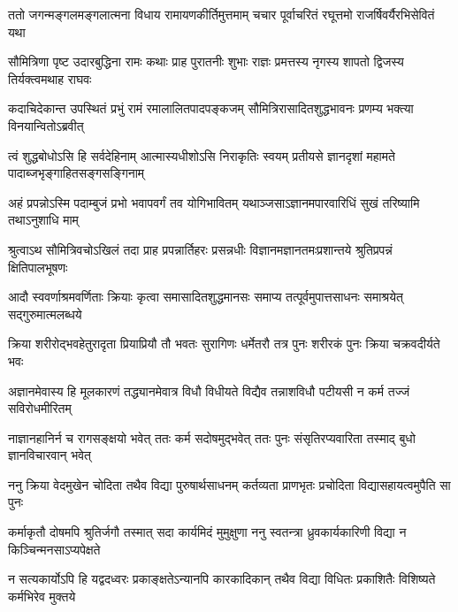 


\fourlineindentedshloka
{ततो जगन्मङ्गलमङ्गलात्मना}
{विधाय रामायणकीर्तिमुत्तमाम्}
{चचार पूर्वाचरितं रघूत्तमो}
{राजर्षिवर्यैरभिसेवितं यथा} %

\fourlineindentedshloka
{सौमित्रिणा पृष्ट उदारबुद्धिना}
{रामः कथाः प्राह पुरातनीः शुभाः}
{राज्ञः प्रमत्तस्य नृगस्य शापतो}
{द्विजस्य तिर्यक्त्वमथाह राघवः} %

\fourlineindentedshloka
{कदाचिदेकान्त उपस्थितं प्रभुं}
{रामं रमालालितपादपङ्कजम्}
{सौमित्रिरासादितशुद्धभावनः}
{प्रणम्य भक्त्या विनयान्वितोऽब्रवीत्} %

\fourlineindentedshloka
{त्वं शुद्धबोधोऽसि हि सर्वदेहिनाम्}
{आत्मास्यधीशोऽसि निराकृतिः स्वयम्}
{प्रतीयसे ज्ञानदृशां महामते}
{पादाब्जभृङ्गाहितसङ्गसङ्गिनाम्} %

\fourlineindentedshloka
{अहं प्रपन्नोऽस्मि पदाम्बुजं प्रभो}
{भवापवर्गं तव योगिभावितम्}
{यथाञ्जसाऽज्ञानमपारवारिधिं}
{सुखं तरिष्यामि तथाऽनुशाधि माम्} %

\fourlineindentedshloka
{श्रुत्वाऽथ सौमित्रिवचोऽखिलं तदा}
{प्राह प्रपन्नार्तिहरः प्रसन्नधीः}
{विज्ञानमज्ञानतमःप्रशान्तये}
{श्रुतिप्रपन्नं क्षितिपालभूषणः} %

\fourlineindentedshloka
{आदौ स्ववर्णाश्रमवर्णिताः क्रियाः}
{कृत्वा समासादितशुद्धमानसः}
{समाप्य तत्पूर्वमुपात्तसाधनः}
{समाश्रयेत् सद्गुरुमात्मलब्धये} %

\fourlineindentedshloka
{क्रिया शरीरोद्भवहेतुरादृता}
{प्रियाप्रियौ तौ भवतः सुरागिणः}
{धर्मेतरौ तत्र पुनः शरीरकं}
{पुनः क्रिया चक्रवदीर्यते भवः} %

\fourlineindentedshloka
{अज्ञानमेवास्य हि मूलकारणं}
{तद्ध्यानमेवात्र विधौ विधीयते}
{विद्यैव तन्नाशविधौ पटीयसी}
{न कर्म तज्जं सविरोधमीरितम्} %

\fourlineindentedshloka
{नाज्ञानहानिर्न च रागसङ्क्षयो}
{भवेत् ततः कर्म सदोषमुद्भवेत्}
{ततः पुनः संसृतिरप्यवारिता}
{तस्माद् बुधो ज्ञानविचारवान् भवेत्} %

\fourlineindentedshloka
{ननु क्रिया वेदमुखेन चोदिता}
{तथैव विद्या पुरुषार्थसाधनम्}
{कर्तव्यता प्राणभृतः प्रचोदिता}
{विद्यासहायत्वमुपैति सा पुनः} %

\fourlineindentedshloka
{कर्माकृतौ दोषमपि श्रुतिर्जगौ}
{तस्मात् सदा कार्यमिदं मुमुक्षुणा}
{ननु स्वतन्त्रा ध्रुवकार्यकारिणी}
{विद्या न किञ्चिन्मनसाऽप्यपेक्षते} %

\fourlineindentedshloka
{न सत्यकार्योऽपि हि यद्वदध्वरः}
{प्रकाङ्क्षतेऽन्यानपि कारकादिकान्}
{तथैव विद्या विधितः प्रकाशितैः}
{विशिष्यते कर्मभिरेव मुक्तये} %

